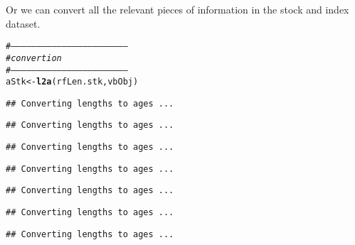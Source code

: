\documentclass[a4paper,english,10pt]{article}\usepackage[]{graphicx}\usepackage[]{color}
\makeatletter
\newcommand{\hlcom}[1]{\textcolor[rgb]{0.678,0.584,0.686}{\textit{#1}}}%
\newcommand{\hlstd}[1]{\textcolor[rgb]{0.345,0.345,0.345}{#1}}%
\newcommand{\hlkwb}[1]{\textcolor[rgb]{0.69,0.353,0.396}{#1}}%
\newcommand{\hlkwd}[1]{\textcolor[rgb]{0.737,0.353,0.396}{\textbf{#1}}}%
\newenvironment{kframe}{%
 \def\at@end@of@kframe{}%
 \ifinner\ifhmode%
  \def\at@end@of@kframe{\end{minipage}}%
  \begin{minipage}{\columnwidth}%
 \fi\fi%
 \def\FrameCommand##1{\hskip\@totalleftmargin \hskip-\fboxsep
 \colorbox{shadecolor}{##1}\hskip-\fboxsep
     \hskip-\linewidth \hskip-\@totalleftmargin \hskip\columnwidth}%
 \MakeFramed {\advance\hsize-\width
   \@totalleftmargin\z@ \linewidth\hsize
   \@setminipage}}%
 {\par\unskip\endMakeFramed%
 \at@end@of@kframe}
\newenvironment{knitrout}{}{} %
\makeatother
\begin{document}
Or we can convert all the relevant pieces of information in the stock and index dataset.

\begin{knitrout}
\color{fgcolor}\begin{kframe}
\begin{alltt}
\hlcom{# --------------------------------------------------------------------}
\hlcom{# convertion}
\hlcom{# --------------------------------------------------------------------}
\hlstd{aStk} \hlkwb{<-} \hlkwd{l2a}\hlstd{(rfLen.stk, vbObj)}
\end{alltt}


{\ttfamily\noindent\color{warningcolor}{\#\# Warning: Individual weights, M and maturity will be averaged accross lengths, everything else will be summed. If this is not what you want, you'll have to deal with these slots by hand.}}\begin{verbatim}
## Converting lengths to ages ...
\end{verbatim}


{\ttfamily\noindent\color{warningcolor}{\#\# Warning: NaNs produced}}\begin{verbatim}
## Converting lengths to ages ...
\end{verbatim}


{\ttfamily\noindent\color{warningcolor}{\#\# Warning: NaNs produced}}\begin{verbatim}
## Converting lengths to ages ...
\end{verbatim}


{\ttfamily\noindent\color{warningcolor}{\#\# Warning: NaNs produced}}\begin{verbatim}
## Converting lengths to ages ...
\end{verbatim}


{\ttfamily\noindent\color{warningcolor}{\#\# Warning: NaNs produced}}\begin{verbatim}
## Converting lengths to ages ...
\end{verbatim}


{\ttfamily\noindent\color{warningcolor}{\#\# Warning: NaNs produced}}\begin{verbatim}
## Converting lengths to ages ...
\end{verbatim}


{\ttfamily\noindent\color{warningcolor}{\#\# Warning: NaNs produced}}\begin{verbatim}
## Converting lengths to ages ...
\end{verbatim}



\end{kframe}
\end{knitrout}
\end{document}
